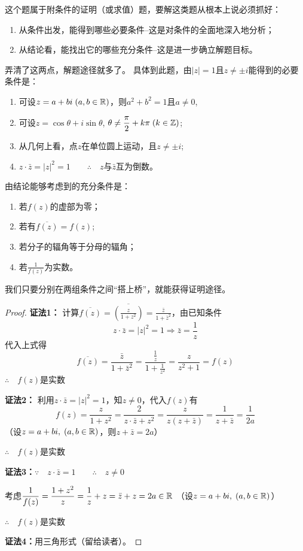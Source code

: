 \begin{analyze}
这个题属于附条件的证明（或求值）题，要解这类题从根本上说必须抓好：
\begin{enumerate}
\item 从条件出发，能得到哪些必要条件--这是对条件的全面地深入地分析；
\item 从结论看，能找出它的哪些充分条件--这是进一步确立解题目标。
\end{enumerate}

    弄清了这两点，解题途径就多了。
    具体到此题，由$|z|=1$且$z\ne \pm i$能得到的必要条件是：
\begin{enumerate}[(1)]
\item 可设$z=a+bi\; (a,b\in\mathbb{R})$，则$a^2+b^2=1$且$a\ne 0$,
\item 可设$z=\cos\theta+i\sin\theta$, $\theta\ne\dfrac{\pi}{2}+k\pi\; (k\in\mathbb{Z})$;
\item 从几何上看，点$z$在单位圆上运动，且$z\ne \pm i$;
\item $z\cdot\bar z=|z|^2=1\qquad  \therefore\quad z$与$\bar z$互为倒数。
\end{enumerate}

    由结论能够考虑到的充分条件是：
\begin{enumerate}[(1)]
    \item 若$f(z)$的虚部为零；
    \item 若有$\overline{f(z)}=f(z)$;
    \item 若分子的辐角等于分母的辐角；
    \item 若$\frac{1}{f(z)}$为实数。
\end{enumerate}

    我们只要分别在两组条件之间“搭上桥”，就能获得证明途径。
\end{analyze}

\begin{proof}
\textbf{证法1：}
计算$\overline{f(z)}=\overline{\left(\frac{z}{1+z^2}\right)}=\frac{\bar z}{1+\bar z^2}$，由已知条件
\[z\cdot \bar z=|z|^2=1\Rightarrow \bar z=\frac{1}{z}\]
代入上式得
\[\overline{f(z)}=\frac{\bar z}{1+\bar z^2}=\frac{\frac{1}{z}}{1+\frac{1}{z^2}}=\frac{z}{z^2+1}=f(z)\]
$\therefore\quad f(z)$是实数

\textbf{证法2：}
利用$z\cdot \bar z=|z|^2=1$，知$z\ne 0$，代入$f(z)$有
\[f(z)=\frac{z}{1+z^2}=\frac{2}{z\cdot \bar z+z^2}=\frac{z}{z(z+\bar z)}=\frac{1}{z+\bar z}=\frac{1}{2a}\]
（设$z=a+bi,\; (a,b\in\mathbb{R})$，则$z+\bar z=2a$）

$\therefore\quad f(z)$是实数

\textbf{证法3：}$\because\quad z\cdot \bar z=1\qquad \therefore\quad z\ne 0$

考虑$\dfrac{1}{f(z)}=\dfrac{1+z^2}{z}=\dfrac{1}{z}+z=\bar z+z=2a\in\mathbb{R}$
（设$z=a+bi,\; (a,b\in\mathbb{R})$）

$\therefore\quad f(z)$是实数

\textbf{证法4：}用三角形式（留给读者）。
\end{proof}

